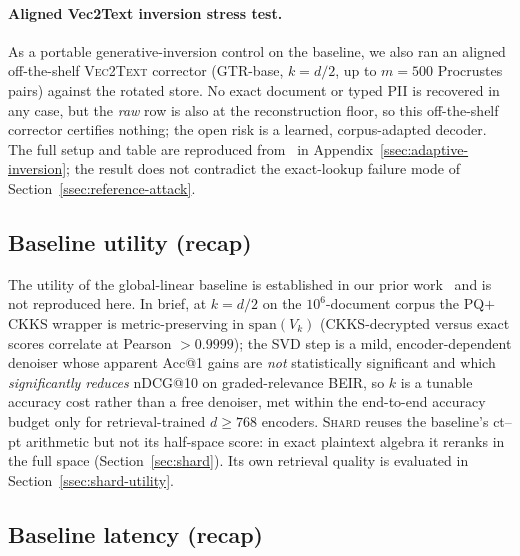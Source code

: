 \paragraph{Aligned Vec2Text inversion stress test.} As a portable
generative-inversion control on the baseline, we also ran an aligned
off-the-shelf \textsc{Vec2Text} corrector (GTR-base, $k=d/2$, up to
$m=500$ Procrustes pairs) against the rotated store. No exact document or
typed PII is recovered in any case, but the \emph{raw} row is also at the
reconstruction floor, so this off-the-shelf corrector certifies nothing;
the open risk is a learned, corpus-adapted decoder. The full setup and
table are reproduced from~\cite{ref_alpha} in
Appendix~\ref{ssec:adaptive-inversion}; the result does not contradict
the exact-lookup failure mode of Section~\ref{ssec:reference-attack}.

\subsection{Baseline utility (recap)}\label{ssec:projection-baselines}\label{ssec:integral}\label{ssec:significance}\label{ssec:beir}

The utility of the global-linear baseline is established in our prior
work~\cite{ref_vkit,ref_alpha} and is not reproduced here. In brief, at
$k=d/2$ on the $10^6$-document corpus the PQ$+$CKKS wrapper is
metric-preserving in $\mathrm{span}(V_k)$ (CKKS-decrypted versus exact
scores correlate at Pearson $>0.9999$); the SVD step is a mild,
encoder-dependent denoiser whose apparent Acc@1 gains are \emph{not}
statistically significant and which \emph{significantly reduces} nDCG@10 on
graded-relevance BEIR, so $k$ is a tunable accuracy cost rather than a free
denoiser, met within the end-to-end accuracy budget only for
retrieval-trained $d\geq768$ encoders. \textsc{Shard} reuses the baseline's
ct--pt arithmetic but not its half-space score: in exact plaintext algebra it
reranks in the full space (Section~\ref{sec:shard}). Its own retrieval quality
is evaluated in Section~\ref{ssec:shard-utility}.

\subsection{Baseline latency (recap)}\label{ssec:latency}

